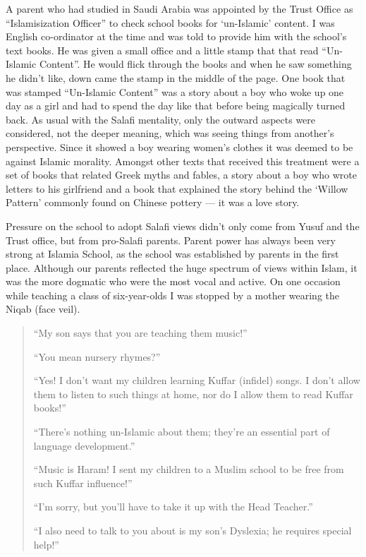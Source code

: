 \documentclass[12pt]{memoir}
\newcommand{\cor}[2]{#2} %
\begin{document}
A parent who had studied in Saudi Arabia was appointed
by the Trust Office as “Islamisization Officer”
to check school books for ‘un-Islamic’ content.
I was English co-ordinator at the time
and was told to provide him with the school’s text books.
He was given a small office and a little stamp
that that read “Un-Islamic Content”.
He would flick \cor{though}{through} the books
and when he saw something he didn’t like,
down came the stamp in the middle of the page.
One book that was stamped “Un-Islamic Content” was a story about a boy
who woke up one day as a girl and had to spend the day like that
before being magically turned back.
As usual with the Salafi mentality,
only the outward aspects were considered, not the deeper meaning,
which was seeing things from another’s perspective.
Since it showed a boy wearing women’s clothes
it was deemed to be against Islamic morality.
Amongst other texts that received this treatment were a set of books
that related Greek myths and fables,
a story about a boy who wrote letters to his girlfriend
and a book that explained the story behind the ‘Willow Pattern’
commonly found on Chinese pottery — it was a love story.

Pressure on the school to adopt Salafi views didn’t only come from Yusuf
and the Trust office, but from pro-Salafi parents.
Parent power has always been very strong at Islamia School,
as the school was established by parents in the first place.
Although our parents reflected the huge spectrum of views within Islam,
it was the more dogmatic who were the most vocal and active.
On one occasion while teaching a class of six-year-olds
I was stopped by a mother wearing the Niqab (face veil).

\begin{quote}
“My son says that you are teaching them music!”

“You mean nursery rhymes?”

“Yes! I don’t want my children learning Kuffar (infidel) songs.
I don’t allow them to listen to such things at home,
nor do I allow them to read Kuffar books!”

“There’s nothing un-Islamic about them;
they’re an essential part of language development.”

“Music is Haram! I sent my children to a Muslim school
to be free from such Kuffar influence!”

“I’m sorry, but you’ll have to take it up with the Head Teacher.”

“I also need to talk to you about is my son’s Dyslexia;
he requires special help!”
\end{quote}
\end{document}
